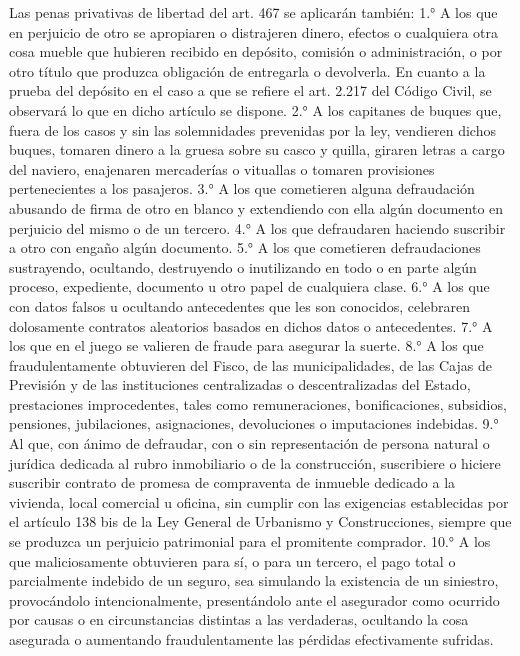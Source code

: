     Las penas privativas de libertad del art. 467 se aplicarán también:
    1.° A los que en perjuicio de otro se apropiaren o distrajeren dinero, efectos o cualquiera otra cosa mueble que hubieren recibido en depósito, comisión o administración, o por otro título que produzca obligación de entregarla o devolverla.
    En cuanto a la prueba del depósito en el caso a que se refiere el art. 2.217 del Código Civil, se observará lo que en dicho artículo se dispone.
    2.° A los capitanes de buques que, fuera de los casos y sin las solemnidades prevenidas por la ley, vendieren dichos buques, tomaren dinero a la gruesa sobre su casco y quilla, giraren letras a cargo del naviero, enajenaren mercaderías o vituallas o tomaren provisiones pertenecientes a los pasajeros.
    3.° A los que cometieren alguna defraudación abusando de firma de otro en blanco y extendiendo con ella algún documento en perjuicio del mismo o de un tercero.
    4.° A los que defraudaren haciendo suscribir a otro con engaño algún documento.
    5.° A los que cometieren defraudaciones sustrayendo, ocultando, destruyendo o inutilizando en todo o en parte algún proceso, expediente, documento u otro papel de cualquiera clase.
    6.° A los que con datos falsos u ocultando antecedentes que les son conocidos, celebraren dolosamente contratos aleatorios basados en dichos datos o antecedentes.
    7.° A los que en el juego se valieren de fraude para asegurar la suerte.
    8.° A los que fraudulentamente obtuvieren del Fisco, de las municipalidades, de las Cajas de Previsión y de las instituciones centralizadas o descentralizadas del Estado, prestaciones improcedentes, tales como remuneraciones, bonificaciones, subsidios, pensiones, jubilaciones, asignaciones, devoluciones o imputaciones indebidas.
    9.° Al que, con ánimo de defraudar, con o sin representación de persona natural o jurídica dedicada al rubro inmobiliario o de la construcción, suscribiere o hiciere suscribir contrato de promesa de compraventa de inmueble dedicado a la vivienda, local comercial u oficina, sin cumplir con las exigencias establecidas por el artículo 138 bis de la Ley General de Urbanismo y Construcciones, siempre que se produzca un perjuicio patrimonial para el promitente comprador.
    10.° A los que maliciosamente obtuvieren para sí, o para un tercero, el pago total o parcialmente indebido de un seguro, sea simulando la existencia de un siniestro, provocándolo intencionalmente, presentándolo ante el asegurador como ocurrido por causas o en circunstancias distintas a las verdaderas, ocultando la cosa asegurada o aumentando fraudulentamente las pérdidas efectivamente sufridas.
